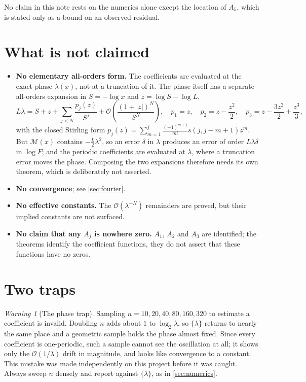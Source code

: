 \documentclass[11pt,oneside]{article}
\theoremstyle{definition}
\theoremstyle{remark}
\newtheorem{warning}[theorem]{Warning}
\newcommand{\bigO}{\mathcal O}
\begin{document}
No claim in this note rests on the numerics alone except the location of
$A_5$, which is stated only as a bound on an observed residual.


\section{What is not claimed}\label{sec:notclaimed}

\begin{itemize}
\item \textbf{No elementary all-orders form.}  The coefficients are evaluated at
  the exact phase $\lambda(x)$, not at a truncation of it.  The phase itself has
  a separate all-orders expansion in $S=-\log x$ and $z=\log S-\log L$,
  \[
    L\lambda=S+z+\sum_{j<N}\frac{p_j(z)}{S^j}+\bigO\!\left(\frac{(1+|z|)^N}{S^N}\right),
    \quad p_1=z,\quad p_2=z-\frac{z^2}{2},\quad p_3=z-\frac{3z^2}{2}+\frac{z^3}{3},
  \]
  with the closed Stirling form
  $p_j(z)=\sum_{m=1}^{j}\frac{(-1)^{m+1}}{m!}s(j,j-m+1)z^m$.  But
  $\mathcal M(x)$ contains $-\tfrac L2\lambda^2$, so an error $\delta$ in
  $\lambda$ produces an error of order $L\lambda\delta$ in $\log F$; and the
  periodic coefficients are evaluated at $\lambda$, where a truncation error
  moves the phase.  Composing the two expansions therefore needs its own
  theorem, which is deliberately not asserted.
\item \textbf{No convergence}; see \cref{sec:fourier}.
\item \textbf{No effective constants.}  The $\bigO(\lambda^{-N})$ remainders are
  proved, but their implied constants are not surfaced.
\item \textbf{No claim that any $A_j$ is nowhere zero.}  $A_1$, $A_2$ and $A_3$
  are identified; the theorems identify the coefficient functions, they do not
  assert that these functions have no zeros.
\end{itemize}

\section{Two traps}\label{sec:traps}

\begin{warning}[The phase trap]
Sampling $n=10,20,40,80,160,320$ to estimate a coefficient is invalid.  Doubling
$n$ adds about $1$ to $\log_2\lambda$, so $\{\lambda\}$ returns to nearly the
same place and a geometric sample holds the phase almost fixed.  Since every
coefficient is one-periodic, such a sample cannot see the oscillation at all;
it shows only the $\bigO(1/\lambda)$ drift in magnitude, and looks like
convergence to a constant.  This mistake was made independently on this project
before it was caught.  Always sweep $n$ densely and report against
$\{\lambda\}$, as in \cref{sec:numerics}.
\end{warning}
\end{document}

